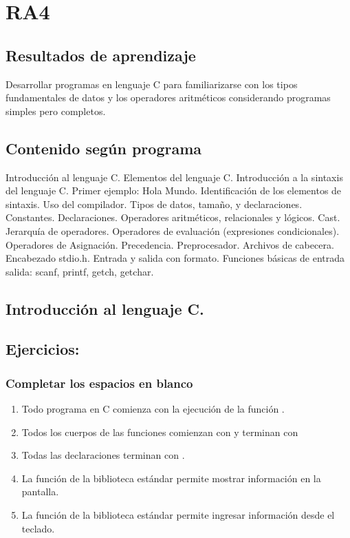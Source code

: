 \section{RA4}
\subsection*{Resultados de aprendizaje}
Desarrollar programas en lenguaje C para familiarizarse con los tipos fundamentales de datos y los operadores aritméticos considerando programas simples pero completos.

\subsection*{Contenido según programa}
Introducción al lenguaje C.  Elementos del lenguaje C.  Introducción a la sintaxis del lenguaje C. Primer ejemplo: Hola Mundo. Identificación de los elementos de sintaxis. Uso del compilador. Tipos de datos, tamaño, y declaraciones.  Constantes. Declaraciones.  Operadores aritméticos, relacionales y lógicos. Cast.  Jerarquía de operadores.  Operadores de evaluación (expresiones condicionales).  Operadores de Asignación.  Precedencia.  Preprocesador. Archivos de cabecera. Encabezado stdio.h. Entrada y salida con formato. Funciones básicas de entrada salida: scanf, printf, getch, getchar.

\subsection*{Introducción al lenguaje C.}
\setcounter{subsection}{3}
\subsection{Ejercicios:}

\subsubsection{Completar los espacios en blanco} 
\begin{enumerate}
  \item Todo programa en C comienza con la ejecución de la función \underspace.
  \item Todos los cuerpos de las funciones comienzan con \underspace y terminan con \underspace
  \item Todas las declaraciones terminan con \underspace.
  \item La función \underspace de la biblioteca estándar permite mostrar información en la pantalla.
  \item La función \underspace de la biblioteca estándar permite ingresar información desde el teclado.
\end{enumerate}

